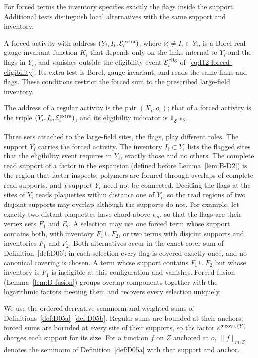 For forced terms the inventory specifies exactly the flags inside the support. Additional tests distinguish local alternatives with the same support and inventory.

\begin{definition}\label{def:D25}
A forced activity with address $(Y_i,I_i,\mathcal E_i^{\rm extra})$, where $\varnothing\ne I_i\subset Y_i$, is a Borel real gauge-invariant function $K_i$ that depends only on the links internal to $Y_i$ and the flags in $Y_i$, and vanishes outside the eligibility event $\mathcal E_i^{\rm elig}$ of~\eqref{eq:I12-forced-eligibility}. Its extra test is Borel, gauge invariant, and reads the same links and flags. These conditions restrict the forced sum to the prescribed large-field inventory.
\end{definition}

The address of a regular activity is the pair $(X_i,o_i)$; that of a forced activity is the triple $(Y_i,I_i,\mathcal E_i^{\rm extra})$, and its eligibility indicator is $\mathbf1_{\mathcal E_i^{\rm elig}}$.

Three sets attached to the large-field sites, the flags, play different roles. The support $Y_i$ carries the forced activity. The inventory $I_i\subset Y_i$ lists the flagged sites that the eligibility event requires in $Y_i$, exactly those and no others. The complete read support of a factor in the expansion (defined before Lemma~\ref{lem:B-D2}) is the region that factor inspects; polymers are formed through overlaps of complete read supports, and a support $Y_i$ need not be connected. Deciding the flags at the sites of $Y_i$ reads plaquettes within distance one of $Y_i$, so the read regions of two disjoint supports may overlap although the supports do not. For example, let exactly two distant plaquettes have chord above $t_m$, so that the flags are their vertex sets $F_1$ and $F_2$. A selection may use one forced term whose support contains both, with inventory $F_1\cup F_2$, or two terms with disjoint supports and inventories $F_1$ and $F_2$. Both alternatives occur in the exact-cover sum of Definition~\ref{def:D06}; in each selection every flag is covered exactly once, and no canonical covering is chosen. A term whose support contains $F_1\cup F_2$ but whose inventory is $F_1$ is ineligible at this configuration and vanishes. Forced fusion (Lemma~\ref{lem:D-fusion}) groups overlap components together with the logarithmic factors meeting them and recovers every selection uniquely.

We use the ordered derivative seminorm and weighted sums of Definitions~\ref{def:D05a}--\ref{def:D05b}. Regular sums are bounded at their anchors; forced sums are bounded at every site of their supports, so the factor $e^{\sigma\operatorname{cov}_B(Y)}$ charges each support for its size. For a function $f$ on $Z$ anchored at $o$, $\|f\|_{m,Z}$ denotes the seminorm of Definition~\ref{def:D05a} with that support and anchor.

